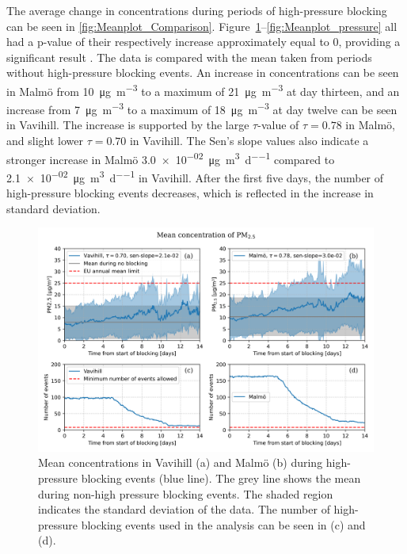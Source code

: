 The average change in \PM concentrations during periods of high-pressure blocking can be seen in \autoref{fig:Meanplot_Comparison}. Figure~\ref{fig:Meanplot_Comparison}--\ref{fig:Meanplot_pressure} all had a p-value of their respectively increase approximately equal to 0, providing a significant result . The data is compared with the \PM mean taken from periods without high-pressure blocking events. An increase in \PM concentrations can be seen in Malmö from \SI{10}{\micro\gram\per\meter\cubed} to a maximum of \SI{21}{\micro\gram\per\meter\cubed} at day thirteen, and an increase from \SI{7}{\micro\gram\per\meter\cubed} to a maximum of \SI{18}{\micro\gram\per\meter\cubed} at day twelve can be seen in Vavihill. The increase is supported by the large $\tau$-value of $\tau=0.78$ in Malmö, and slight lower $\tau=0.70$ in Vavihill. The Sen's slope values also indicate a stronger increase in Malmö \SI{3.0e-02}{\micro\gram\per\meter\cubed\per\day} compared to \SI{2.1e-02}{\micro\gram\per\meter\cubed\per\day} in Vavihill. After the first five days, the number of high-pressure blocking events decreases, which is reflected in the increase in standard deviation. 


\begin{figure}[H]
    \centering
    \includegraphics[width=\textwidth]{Figures/Meanplot.png}
    \caption{Mean \PM concentrations in Vavihill (a) and Malmö (b) during high-pressure blocking events (blue line). The grey line shows the mean \PM during non-high pressure blocking events. The shaded region indicates the standard deviation of the data. The number of high-pressure blocking events used in the analysis can be seen in (c) and (d).}
    \label{fig:Meanplot_Comparison}
\end{figure}


